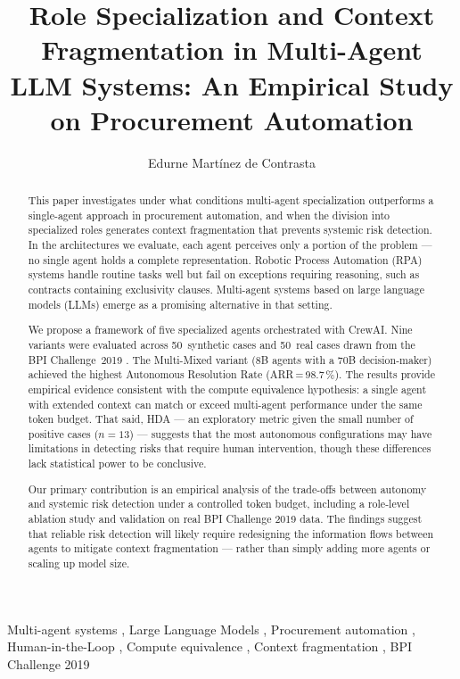 \documentclass[preprint,12pt,numrefs]{elsarticle}
\begin{document}
\begin{frontmatter}

\title{Role Specialization and Context Fragmentation in Multi-Agent LLM
       Systems: An Empirical Study on Procurement Automation}

\author[uax,proj]{Edurne Martínez de Contrasta}

\address[uax]{Master's in Big Data and Business Analytics,
              Universidad Alfonso X el Sabio, Campus Mare Nostrum, Málaga, Spain}
\address[proj]{PROJENER.AI SL, Madrid, Spain}

\begin{abstract}
This paper investigates under what conditions multi-agent specialization
outperforms a single-agent approach in procurement automation, and when
the division into specialized roles generates context fragmentation that
prevents systemic risk detection. In the architectures we evaluate, each
agent perceives only a portion of the problem --- no single agent holds
a complete representation. Robotic Process Automation (RPA) systems handle
routine tasks well but fail on exceptions requiring reasoning, such as
contracts containing exclusivity clauses. Multi-agent systems based on
large language models (LLMs) emerge as a promising alternative in that
setting.

We propose a framework of five specialized agents orchestrated with
CrewAI. Nine variants were evaluated across 50~synthetic cases and
50~real cases drawn from the BPI Challenge~2019
\citep{vandongen2019bpi}. The Multi-Mixed variant (8B agents with a
70B decision-maker) achieved the highest Autonomous Resolution Rate
(ARR\,=\,98.7\,\%). The results provide empirical evidence consistent
with the compute equivalence hypothesis: a single agent with extended
context can match or exceed multi-agent performance under the same token
budget. That said, HDA --- an exploratory metric given the small 
number of positive cases ($n=13$) --- suggests that the most 
autonomous configurations may have limitations in detecting 
risks that require human intervention, though these differences 
lack statistical power to be conclusive.


Our primary contribution is an empirical analysis of the trade-offs
between autonomy and systemic risk detection under a controlled token
budget, including a role-level ablation study and validation on real
BPI Challenge 2019 data. The findings suggest that reliable risk
detection will likely require redesigning the information flows between
agents to mitigate context fragmentation --- rather than simply adding
more agents or scaling up model size.
\end{abstract}

\begin{keyword}
Multi-agent systems \sep
Large Language Models \sep
Procurement automation \sep
Human-in-the-Loop \sep
Compute equivalence \sep
Context fragmentation \sep
BPI Challenge 2019
\end{keyword}

\end{frontmatter}
\end{document}
